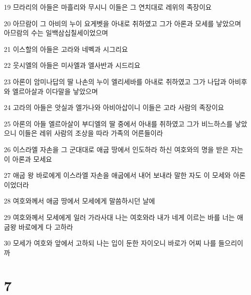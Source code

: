 \par 19 므라리의 아들은 마흘리와 무시니 이들은 그 연치대로 레위의 족장이요
\par 20 아므람이 그 아비의 누이 요게벳을 아내로 취하였고 그가 아론과 모세를 낳았으며 아므람의 수는 일백삼십칠세이었으며
\par 21 이스할의 아들은 고라와 네벡과 시그리요
\par 22 웃시엘의 아들은 미사엘과 엘사반과 시드리요
\par 23 아론이 암미나답의 딸 나손의 누이 엘리세바를 아내로 취하였고 그가 나답과 아비후와 엘르아살과 이다말을 낳았으며
\par 24 고라의 아들은 앗실과 엘가나와 아비아삽이니 이들은 고라 사람의 족장이요
\par 25 아론의 아들 엘르아살이 부디엘의 딸 중에서 아내를 취하였고 그가 비느하스를 낳았으니 이들은 레위 사람의 조상을 따라 가족의 어른들이라
\par 26 이스라엘 자손을 그 군대대로 애굽 땅에서 인도하라 하신 여호와의 명을 받은 자는 이 아론과 모세요
\par 27 애굽 왕 바로에게 이스라엘 자손을 애굽에서 내어 보내라 말한 자도 이 모세와 아론이었더라
\par 28 여호와께서 애굽 땅에서 모세에게 말씀하시던 날에
\par 29 여호와께서 모세에게 일러 가라사대 나는 여호와라 내가 네게 이르는 바를 너는 애굽왕 바로에게 다 고하라
\par 30 모세가 여호와 앞에서 고하되 나는 입이 둔한 자이오니 바로가 어찌 나를 들으리이까

\chapter{7}

